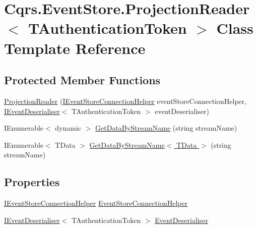 \hypertarget{classCqrs_1_1EventStore_1_1ProjectionReader}{}\section{Cqrs.\+Event\+Store.\+Projection\+Reader$<$ T\+Authentication\+Token $>$ Class Template Reference}
\label{classCqrs_1_1EventStore_1_1ProjectionReader}
\subsection*{Protected Member Functions}
\begin{DoxyCompactItemize}
\item 
\hyperlink{classCqrs_1_1EventStore_1_1ProjectionReader_a87d5f996f75577bb6ae18704c9a590a2_a87d5f996f75577bb6ae18704c9a590a2}{Projection\+Reader} (\hyperlink{interfaceCqrs_1_1EventStore_1_1IEventStoreConnectionHelper}{I\+Event\+Store\+Connection\+Helper} event\+Store\+Connection\+Helper, \hyperlink{interfaceCqrs_1_1EventStore_1_1IEventDeserialiser}{I\+Event\+Deserialiser}$<$ T\+Authentication\+Token $>$ event\+Deserialiser)
\item 
I\+Enumerable$<$ dynamic $>$ \hyperlink{classCqrs_1_1EventStore_1_1ProjectionReader_adcc229abde429acfa6b125b3a93a85b4_adcc229abde429acfa6b125b3a93a85b4}{Get\+Data\+By\+Stream\+Name} (string stream\+Name)
\item 
I\+Enumerable$<$ T\+Data $>$ \hyperlink{classCqrs_1_1EventStore_1_1ProjectionReader_adb256fc2c761a0add40c84fe2c1cb6e8_adb256fc2c761a0add40c84fe2c1cb6e8}{Get\+Data\+By\+Stream\+Name$<$ T\+Data $>$} (string stream\+Name)
\end{DoxyCompactItemize}
\subsection*{Properties}
\begin{DoxyCompactItemize}
\item 
\hyperlink{interfaceCqrs_1_1EventStore_1_1IEventStoreConnectionHelper}{I\+Event\+Store\+Connection\+Helper} \hyperlink{classCqrs_1_1EventStore_1_1ProjectionReader_ab169b1404cc40751c3a71c772ed0eaa4_ab169b1404cc40751c3a71c772ed0eaa4}{Event\+Store\+Connection\+Helper}
\item 
\hyperlink{interfaceCqrs_1_1EventStore_1_1IEventDeserialiser}{I\+Event\+Deserialiser}$<$ T\+Authentication\+Token $>$ \hyperlink{classCqrs_1_1EventStore_1_1ProjectionReader_a2c7ada08a9525c161eb7e42e2dbf55e0_a2c7ada08a9525c161eb7e42e2dbf55e0}{Event\+Deserialiser}
\end{DoxyCompactItemize}


